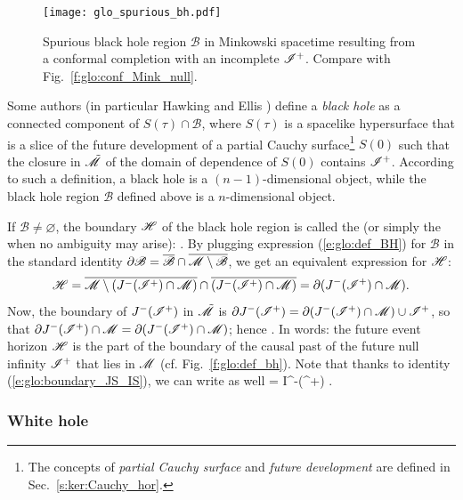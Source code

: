 \begin{figure}
\centerline{\texttt{[image: glo\_spurious\_bh.pdf]}}
\caption[]{\label{f:glo:spurious_bh} \footnotesize
Spurious black hole region $\mathscr{B}$ in Minkowski spacetime resulting
from a conformal completion with an incomplete $\mathscr{I}^+$.
Compare with Fig.~\ref{f:glo:conf_Mink_null}.}
\end{figure}


\begin{remark}
Some authors (in particular Hawking and Ellis \cite{HawkiE73}) define a
\emph{black hole} as a connected component of
$S(\tau) \cap \mathscr{B}$, where $S(\tau)$ is a spacelike
hypersurface that is a slice of the future development of a partial
Cauchy surface\footnote{The concepts of \emph{partial Cauchy surface}
and \emph{future development} are defined in Sec.~\ref{s:ker:Cauchy_hor}.} $S(0)$ such that the
closure in $\tilde{\mathscr{M}}$ of the domain of dependence of $S(0)$ contains $\mathscr{I}^+$.
According to such a definition, a black hole is a $(n-1)$-dimensional object,
while the black hole region $\mathscr{B}$ defined above is a $n$-dimensional object.
\end{remark}

If $\mathscr{B}\not=\varnothing$, the boundary $\mathscr{H}$ of the black hole region
is called the 
(or simply the 
when no ambiguity may arise):
\be
    .
\ee
By plugging expression (\ref{e:glo:def_BH}) for $\mathscr{B}$ in the standard
identity $\partial \mathscr{B} =
\overline{\mathscr{B}} \cap \overline{\mathscr{M}\setminus \mathscr{B}}$, we get
an equivalent expression for $\mathscr{H}$:
\[
    \mathscr{H} = \overline{\mathscr{M} \setminus (J^-(\mathscr{I}^+)\cap\mathscr{M})} \cap
        \overline{(J^-(\mathscr{I}^+)\cap\mathscr{M})}
        = \partial(J^-(\mathscr{I}^+)\cap\mathscr{M}) .
\]
Now, the boundary of $J^-(\mathscr{I}^+)$ in $\tilde{\mathscr{M}}$ is
$\partial J^-(\mathscr{I}^+) = \partial (J^-(\mathscr{I}^+)\cap\mathscr{M}) \cup \mathscr{I}^+$, so that
$\partial J^-(\mathscr{I}^+) \cap \mathscr{M} =  \partial(J^-(\mathscr{I}^+)\cap\mathscr{M})$; hence
\be \label{e:glo:Hor_bound_past_scrip}
    .
\ee
In words: the future event horizon $\mathscr{H}$ is the part of the boundary of the causal past
of the future null infinity $\mathscr{I}^+$ that lies in $\mathscr{M}$ (cf. Fig.~\ref{f:glo:def_bh}).
Note that thanks to identity (\ref{e:glo:boundary_JS_IS}), we can write as
well
\be
    \Hor = \partial I^-(\scri^+) \cap \M .
\ee

\subsubsection{White hole}

